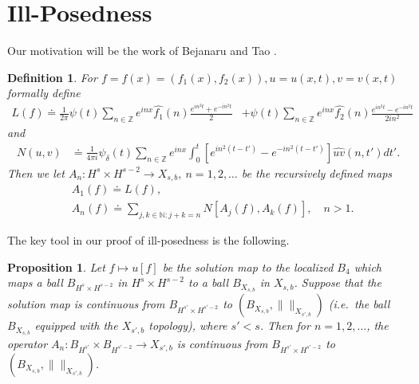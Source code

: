 \documentclass[12pt,reqno]{amsart}
\numberwithin{equation}{section}  %
\newcommand{\zz}{\mathbb{Z}}
\newcommand{\wh}{\widehat}
\newtheorem{proposition}[theorem]{Proposition}
\newtheorem{definition}[theorem]{Definition}
\begin{document}
\section{Ill-Posedness}
Our motivation will be the work of Bejanaru and Tao
\cite{Bejenaru-Tao-2006-Sharp-well-posedness-and-ill-posedness}. 
%
\begin{definition}
  For $f =f(x)= (f_{1}(x), f_{2}(x)), u = u(x,t), v = v(x,t)$ formally define 
%
%
\begin{equation*}
\begin{split}
  L(f)
  \doteq \frac{1}{2 \pi} \psi(t) \sum_{n \in \zz} e^{inx}
  \wh{f_{1}}(n) \frac{e^{in^{2}t} + e^{-in^{2}t}}{2} 
  & + \psi(t) \sum_{n \in \zz} e^{inx}
  \wh{f_{2}}(n)\frac{e^{in^{2}t} - e^{-in^{2}t}}{2 i n^{2}} 
\end{split}
\end{equation*}
%
%
and
%
%
\begin{equation*}
\begin{split}
N(u, v)
& \doteq \frac{1}{4 \pi i} \psi_{\delta}(t) \sum_{n \in \zz} e^{inx}
    \int_{0}^{t}[e^{in^{2}(t-t')}-e^{-in^{2}(t-t')}]
    \wh{uv}(n, t') dt'.
\end{split}
\end{equation*}
%
%
Then we let $A_{n}: H^{s} \times H^{s-2} \to X_{s,b}, \ n = 1, 2, \dots$ be the
recursively defined maps
%
%
\begin{equation*}
\begin{split}
  & A_{1}(f) \doteq L(f),
  \\
  & A_{n}(f) \doteq \sum_{j, k \in \mathbb{N}: j + k = n} N\left[
  A_{j}(f), A_{k}(f) \right], \quad n > 1.
\end{split}
\end{equation*}

\end{definition}
%
The key tool in our proof of ill-posedness is the following. 
\begin{proposition}
  Let $f \mapsto u[f]$ be the solution map to the localized
  $B_{4}$ which maps a ball $B_{H^{s} \times H^{s-2}}$ in $H^{s} \times
  H^{s-2}$ to a ball $B_{X_{s,b}}$ in $X_{s,b}$. Suppose that the solution map
  is continuous from $B_{H^{s'} \times
  H^{s'-2}}$ to $(B_{X_{s,b}}, \| \|_{X_{s', b}})$ (i.e.\ the
  ball $B_{X_{s,b}}$ equipped with the $X_{s',b}$ topology),
  where $s' < s$. Then for  $n=1,2,\dots$, the operator $A_{n} :
  B_{H^{s'}} \times B_{H^{s'-2}} \to X_{s',b}$ is continuous
  from $B_{H^{s'} \times {H^{s'-2}}}$
  to $(B_{X_{s,b}}, \|  \|_{X_{s',b}})$.
\label{prop:ill-posedness}
\end{proposition}
\end{document}

